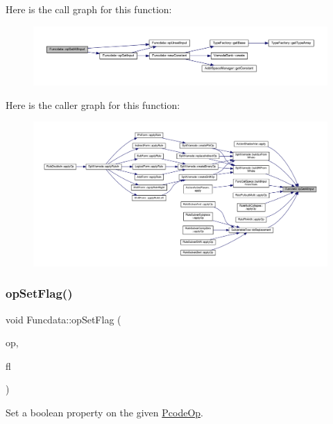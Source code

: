 Here is the call graph for this function\+:
\nopagebreak
\begin{figure}[H]
\begin{center}
\leavevmode
\includegraphics[width=350pt]{class_funcdata_adcad3bfd56955103a031fa6d0e78acec_cgraph}
\end{center}
\end{figure}
Here is the caller graph for this function\+:
\nopagebreak
\begin{figure}[H]
\begin{center}
\leavevmode
\includegraphics[width=350pt]{class_funcdata_adcad3bfd56955103a031fa6d0e78acec_icgraph}
\end{center}
\end{figure}
\mbox{\label{class_funcdata_a9c3e905343d8d9679b8aad2cde2c4096}} 
\subsubsection{\texorpdfstring{opSetFlag()}{opSetFlag()}}
{\footnotesize\ttfamily void Funcdata\+::op\+Set\+Flag (\begin{DoxyParamCaption}\item[{\mbox{\hyperlink{class_pcode_op}{Pcode\+Op}} $\ast$}]{op,  }\item[{uint4}]{fl }\end{DoxyParamCaption})\hspace{0.3cm}{\ttfamily [inline]}}



Set a boolean property on the given \mbox{\hyperlink{class_pcode_op}{Pcode\+Op}}. 



